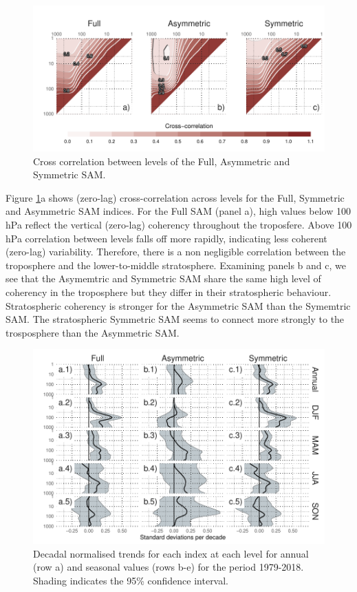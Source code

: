 \documentclass[twocol]{ametsocV5}
\begin{document}
\begin{figure}
\includegraphics{cross-correlation-1} \caption[Cross correlation between levels of the Full, Asymmetric and Symmetric SAM]{Cross correlation between levels of the Full, Asymmetric and Symmetric SAM.}\label{fig:cross-correlation}
\end{figure}

Figure \ref{fig:cross-correlation}a shows (zero-lag) cross-correlation
across levels for the Full, Symmetric and Asymmetric SAM indices. For
the Full SAM (panel a), high values below 100 hPa reflect the vertical
(zero-lag) coherency throughout the troposfere. Above 100 hPa
correlation between levels falls off more rapidly, indicating less
coherent (zero-lag) variability. Therefore, there is a non negligible
correlation between the troposphere and the lower-to-middle
stratosphere. Examining panels b and c, we see that the Asymemtric and
Symmetric SAM share the same high level of coherency in the troposphere
but they differ in their stratospheric behaviour. Stratospheric
coherency is stronger for the Asymmetric SAM than the Symemtric SAM. The
stratospheric Symmetric SAM seems to connect more strongly to the
trosposphere than the Asymmetric SAM.

\begin{figure}
\includegraphics{trends-1} \caption[Decadal normalised trends for each index at each level for annual (row a) and seasonal values (rows b-e) for the period 1979-2018]{Decadal normalised trends for each index at each level for annual (row a) and seasonal values (rows b-e) for the period 1979-2018. Shading indicates the 95\% confidence interval.}\label{fig:trends}
\end{figure}
\end{document}
